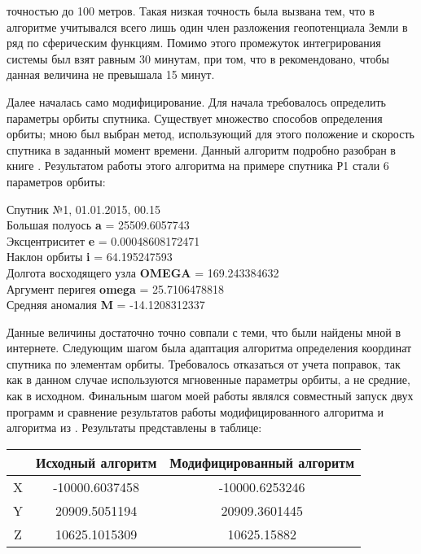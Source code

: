 \documentclass[a4paper,12pt]{report}
\begin{document}
точностью до 100 метров. Такая низкая точность была вызвана тем, что в алгоритме учитывался всего лишь один член разложения геопотенциала Земли в ряд по сферическим функциям. Помимо этого промежуток 
интегрирования системы был взят равным 30 минутам, при том, что в \cite[p.~56]{ikd} рекомендовано, чтобы данная величина не превышала 15 минут. \par
Далее началась само модифицирование. Для начала требовалось определить параметры орбиты спутника. Существует множество способов определения орбиты; мною был выбран метод, использующий для этого
положение и скорость спутника в заданный момент времени. Данный алгоритм подробно разобран в книге \cite[p.~155]{kholsh}. Результатом работы этого алгоритма на примере спутника Р1 стали 6 параметров
орбиты:
\bigskip
\begin{center}
Спутник №1, 01.01.2015, 00.15\\

Большая полуось \textbf{a} =  25509.6057743\\
Эксцентриситет \textbf{e} =  0.00048608172471\\
Наклон орбиты \textbf{i} =  64.195247593\\
Долгота восходящего узла \textbf{OMEGA} =  169.243384632\\
Аргумент перигея \textbf{omega} =  25.7106478818\\
Средняя аномалия \textbf{M} =  -14.1208312337\\
\end{center}
\bigskip
\par Данные величины достаточно точно совпали с теми, что были найдены мной в интернете. Следующим шагом была адаптация алгоритма определения координат спутника по элементам орбиты. Требовалось
отказаться от учета поправок, так как в данном случае используются мгновенные параметры орбиты, а не средние, как в исходном. Финальным шагом моей работы являлся совместный запуск двух программ
и сравнение результатов работы модифицированного алгоритма и алгоритма из \cite{ikd}. Результаты представлены в таблице:
\bigskip
\begin{center}
\begin{tabular}{|c|c|c|}
\hline
& Исходный алгоритм & Модифицированный алгоритм \\ \hline
X & -10000.6037458 & -10000.6253246 \\ \hline
Y & 20909.5051194 & 20909.3601445 \\ \hline
Z & 10625.1015309 & 10625.15882 \\ \hline
\end{tabular}
\end{center}
\end{document}
